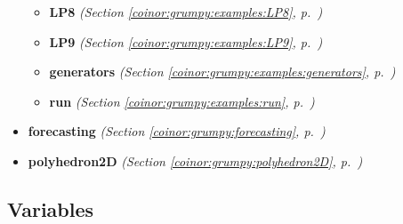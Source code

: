 \begin{itemize}
\begin{itemize}
    \item \textbf{LP8}
  \textit{(Section \ref{coinor:grumpy:examples:LP8}, p.~\pageref{coinor:grumpy:examples:LP8})}

    \item \textbf{LP9}
  \textit{(Section \ref{coinor:grumpy:examples:LP9}, p.~\pageref{coinor:grumpy:examples:LP9})}

    \item \textbf{generators}
  \textit{(Section \ref{coinor:grumpy:examples:generators}, p.~\pageref{coinor:grumpy:examples:generators})}

    \item \textbf{run}
  \textit{(Section \ref{coinor:grumpy:examples:run}, p.~\pageref{coinor:grumpy:examples:run})}

  \end{itemize}
\item \textbf{forecasting}
  \textit{(Section \ref{coinor:grumpy:forecasting}, p.~\pageref{coinor:grumpy:forecasting})}

\item \textbf{polyhedron2D}
  \textit{(Section \ref{coinor:grumpy:polyhedron2D}, p.~\pageref{coinor:grumpy:polyhedron2D})}

\end{itemize}



  \subsection{Variables}

